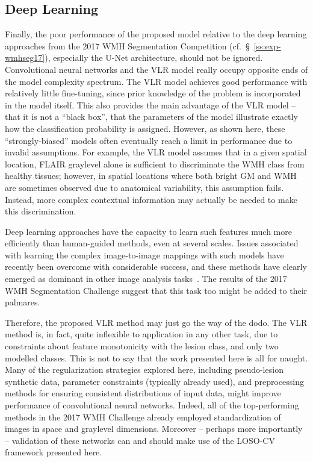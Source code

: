 \subsection{Deep Learning}
Finally, the poor performance of the proposed model relative to the deep learning approaches
from the 2017 WMH Segmentation Competition (cf.~\S~\ref{ss:exp-wmhseg17}),
especially the U-Net architecture, should not be ignored.
Convolutional neural networks and the VLR model really occupy opposite ends of the
model complexity spectrum.
The VLR model achieves good performance with relatively little fine-tuning,
since prior knowledge of the problem is incorporated in the model itself.
This also provides the main advantage of the VLR model
-- that it is not a ``black box'', that the parameters of the model
illustrate exactly how the classification probability is assigned.
However, as shown here, these ``strongly-biased'' models
often eventually reach a limit in performance due to invalid assumptions.
For example, the VLR model assumes that in a given spatial location,
FLAIR graylevel alone is sufficient to discriminate the WMH class from healthy tissues;
however, in spatial locations where both bright GM and WMH are sometimes observed
due to anatomical variability, this assumption fails.
Instead, more complex contextual information may actually be needed to
make this discrimination.
\par
Deep learning approaches have the capacity to learn such features
much more efficiently than human-guided methods, even at several scales.
Issues associated with learning the complex image-to-image mappings
with such models have recently been overcome with considerable success,
and these methods have clearly emerged
as dominant in other image analysis tasks~\cite{Ronneberger2015}.
The results of the 2017 WMH Segmentation Challenge suggest that this task too
might be added to their palmares.
\par
Therefore, the proposed VLR method may just go the way of the dodo.
The VLR method is, in fact, quite inflexible to application in any other task, due to
constraints about feature monotonicity with the lesion class,
and only two modelled classes.
This is not to say that the work presented here is all for naught.
Many of the regularization strategies explored here,
including pseudo-lesion synthetic data,
parameter constraints (typically already used),
and preprocessing methods for ensuring consistent distributions of input data,
might improve performance of convolutional neural networks.
Indeed, all of the top-performing methods in the 2017 WMH Challenge
already employed standardization of images in space and graylevel dimensions.
Moreover -- perhaps more importantly -- validation of these networks
can and should make use of the LOSO-CV framework presented here.
